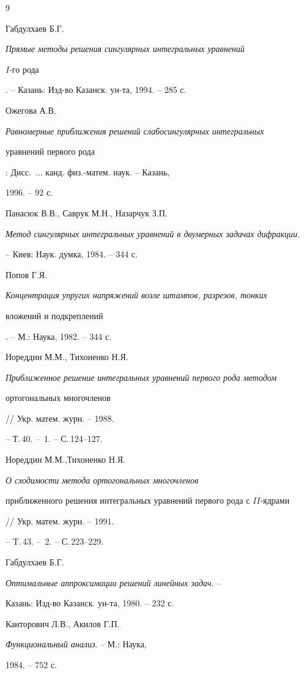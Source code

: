 \begin{thebibliography}{9}







Габдулхаев Б.Г.


{\em Прямые методы решения сингулярных интегральных уравнений


$I$-го рода}. -- Казань: Изд-во Казанск. ун-та, 1994. -- 285 с.




Ожегова А.В.


{\em Равномерные приближения решений слабосингулярных интегральных


уравнений первого рода}: Дисс.~$\dotsc$ канд. физ.-матем. наук. -- Казань,


1996. -- 92 с.




Панасюк В.В., Саврук М.Н., Назарчук З.П.


{\em Метод сингулярных интегральных уравнений в двумерных задачах дифракции}.


-- Киев: Наук. думка, 1984. -- 344 с.




Попов Г.Я.


{\em Концентрация упругих напряжений возле штампов, разрезов, тонких


вложений и подкреплений}. -- М.: Наука, 1982. -- 344 с.




Нореддин М.М., Тихоненко Н.Я.


{\em Приближенное решение интегральных уравнений первого рода методом


ортогональных многочленов} // Укр. матем. журн. -- 1988.


-- Т.\,40. -- \No\,1. -- С.\,124--127.




Нореддин М.М.,Тихоненко Н.Я.


{\em О сходимости метода ортогональных многочленов


приближенного решения интегральных уравнений первого рода с $II$-ядрами}


// Укр. матем. журн. -- 1991.


-- T.\,43. -- \No\,2. -- С.\,223--229.




Габдулхаев Б.Г.


{\em Оптимальные аппроксимации решений линейных задач}. --


Казань: Изд-во Казанск. ун-та, 1980. -- 232 с.




Канторович Л.В., Акилов Г.П.


{\em Функциональный анализ}. -- М.: Наука,


1984. -- 752 с.





\end{thebibliography}





